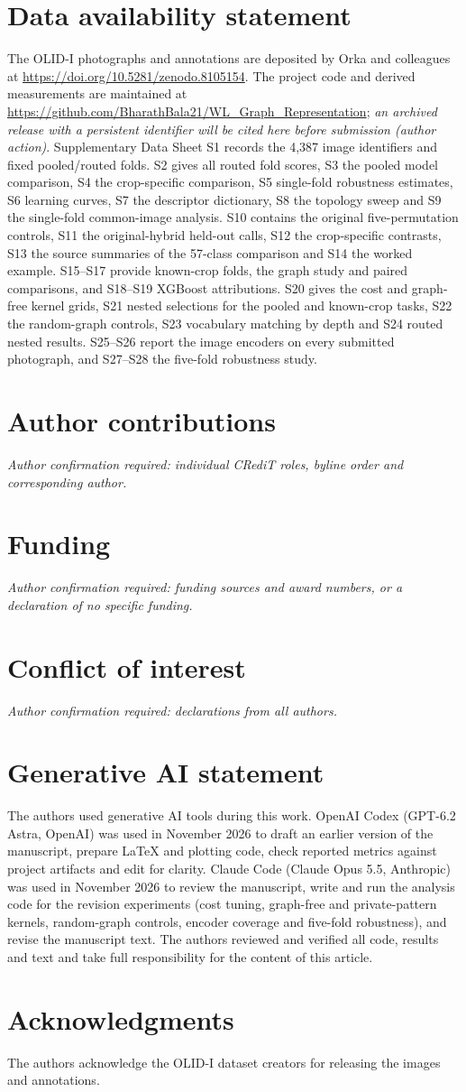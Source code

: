 \section*{Data availability statement}
The OLID-I photographs and annotations are deposited by Orka and colleagues at \url{https://doi.org/10.5281/zenodo.8105154}. The project code and derived measurements are maintained at \url{https://github.com/BharathBala21/WL_Graph_Representation}; \textit{an archived release with a persistent identifier will be cited here before submission (author action)}. Supplementary Data Sheet S1 records the 4,387 image identifiers and fixed pooled/routed folds. S2 gives all routed fold scores, S3 the pooled model comparison, S4 the crop-specific comparison, S5 single-fold robustness estimates, S6 learning curves, S7 the descriptor dictionary, S8 the topology sweep and S9 the single-fold common-image analysis. S10 contains the original five-permutation controls, S11 the original-hybrid held-out calls, S12 the crop-specific contrasts, S13 the source summaries of the 57-class comparison and S14 the worked example. S15--S17 provide known-crop folds, the graph study and paired comparisons, and S18--S19 XGBoost attributions. S20 gives the cost and graph-free kernel grids, S21 nested selections for the pooled and known-crop tasks, S22 the random-graph controls, S23 vocabulary matching by depth and S24 routed nested results. S25--S26 report the image encoders on every submitted photograph, and S27--S28 the five-fold robustness study.

\section*{Author contributions}
\textit{Author confirmation required: individual CRediT roles, byline order and corresponding author.}
\section*{Funding}
\textit{Author confirmation required: funding sources and award numbers, or a declaration of no specific funding.}
\section*{Conflict of interest}
\textit{Author confirmation required: declarations from all authors.}
\section*{Generative AI statement}
The authors used generative AI tools during this work. OpenAI Codex (GPT-6.2 Astra, OpenAI) was used in November 2026 to draft an earlier version of the manuscript, prepare LaTeX and plotting code, check reported metrics against project artifacts and edit for clarity. Claude Code (Claude Opus 5.5, Anthropic) was used in November 2026 to review the manuscript, write and run the analysis code for the revision experiments (cost tuning, graph-free and private-pattern kernels, random-graph controls, encoder coverage and five-fold robustness), and revise the manuscript text. The authors reviewed and verified all code, results and text and take full responsibility for the content of this article.
\section*{Acknowledgments}
The authors acknowledge the OLID-I dataset creators for releasing the images and annotations.
